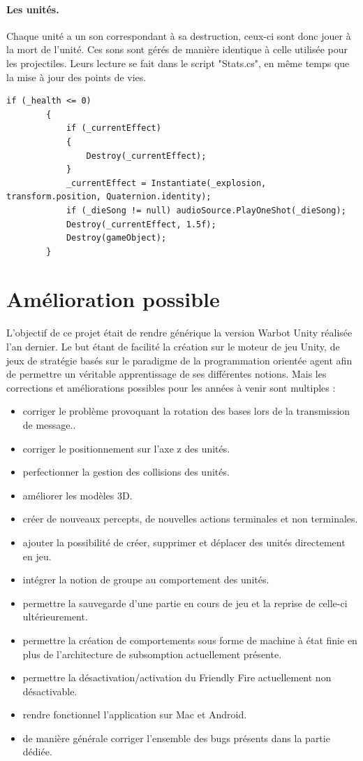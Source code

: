 \documentclass{report}
\begin{document}
\paragraph{Les unités.}
Chaque unité a un son correspondant à sa destruction, ceux-ci sont donc jouer à la mort de l'unité. Ces sons sont gérés de manière identique à celle utilisée pour les projectiles. Leurs lecture se fait dans le script "Stats.cs", en même temps que la mise à jour des points de vies. 
\begin{lstlisting}[language={[Sharp]C},label={lst:bulletAudio}, caption= Extrait du code de Stats.cs ]
if (_health <= 0)
        {
            if (_currentEffect)
            {
                Destroy(_currentEffect);
            }
            _currentEffect = Instantiate(_explosion, transform.position, Quaternion.identity);
            if (_dieSong != null) audioSource.PlayOneShot(_dieSong);
            Destroy(_currentEffect, 1.5f);
            Destroy(gameObject);
        }
\end{lstlisting}
\section{Amélioration possible}
L’objectif de ce projet était de rendre générique la version Warbot Unity réalisée l'an dernier.
Le but étant de facilité la création sur le moteur de jeu Unity, de jeux de stratégie basés sur le paradigme de  la programmation orientée agent afin de permettre un véritable apprentissage de ses différentes notions. Mais les corrections et améliorations possibles pour les années à
venir sont multiples :
\begin{itemize}
\item corriger le problème provoquant la rotation des bases lors de la transmission de message..
\item corriger le positionnement sur l'axe z des unités.
\item perfectionner la gestion des collisions des unités.
\item améliorer les modèles 3D.
\item créer de nouveaux percepts, de nouvelles actions terminales et non terminales.
\item ajouter la possibilité de créer, supprimer et déplacer des unités directement en jeu.
\item intégrer la notion de groupe au comportement des unités.
\item permettre la sauvegarde d'une partie en cours de jeu et la reprise de celle-ci ultérieurement.
\item permettre la création de comportements sous forme de machine à état finie en plus de l'architecture de subsomption actuellement présente.
\item permettre la désactivation/activation du Friendly Fire actuellement non désactivable.
\item rendre fonctionnel l'application sur Mac et Android.
\item de manière générale corriger l'ensemble des bugs présents dans la partie dédiée.
\end{itemize}
\end{document}
